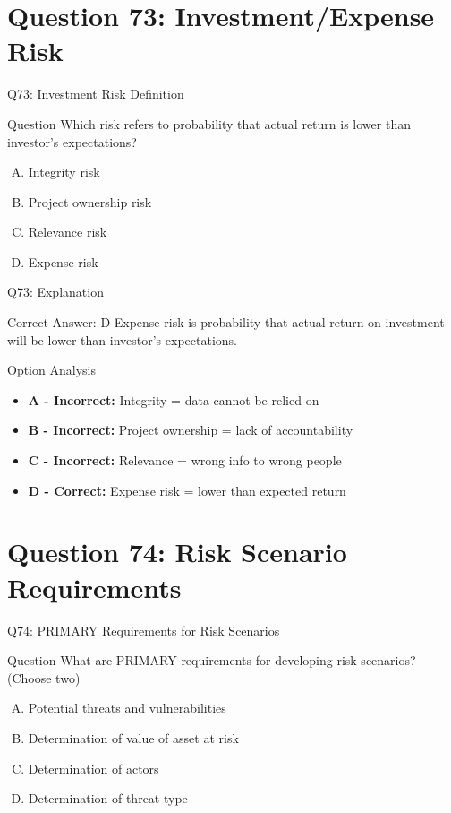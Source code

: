 \documentclass{beamer}
\begin{document}
	\section{Question 73: Investment/Expense Risk}
	
	\begin{frame}{Q73: Investment Risk Definition}
		\begin{block}{Question}
			Which risk refers to probability that actual return is lower than investor's expectations?
		\end{block}
		\begin{enumerate}[(A)]
			\item Integrity risk
			\item Project ownership risk
			\item Relevance risk
			\item Expense risk
		\end{enumerate}
	\end{frame}
	
	\begin{frame}{Q73: Explanation}
		\begin{block}{Correct Answer: D}
			Expense risk is probability that actual return on investment will be lower than investor's expectations.
		\end{block}
		\begin{block}{Option Analysis}
			\begin{itemize}
				\item \textbf{A - Incorrect:} Integrity = data cannot be relied on
				\item \textbf{B - Incorrect:} Project ownership = lack of accountability
				\item \textbf{C - Incorrect:} Relevance = wrong info to wrong people
				\item \textbf{D - Correct:} Expense risk = lower than expected return
			\end{itemize}
		\end{block}
	\end{frame}
	
	\section{Question 74: Risk Scenario Requirements}
	
	\begin{frame}{Q74: PRIMARY Requirements for Risk Scenarios}
		\begin{block}{Question}
			What are PRIMARY requirements for developing risk scenarios? (Choose two)
		\end{block}
		\begin{enumerate}[(A)]
			\item Potential threats and vulnerabilities
			\item Determination of value of asset at risk
			\item Determination of actors
			\item Determination of threat type
		\end{enumerate}
	\end{frame}
	
\end{document}
